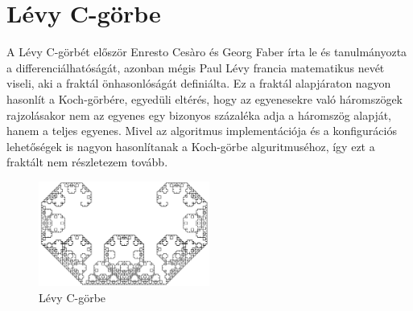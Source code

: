 \section*{Lévy C-görbe}
A Lévy C-görbét először Enresto Cesàro és Georg Faber írta le és tanulmányozta a differenciálhatóságát, azonban mégis Paul Lévy francia matematikus nevét viseli, aki a fraktál önhasonlóságát definiálta. Ez a fraktál alapjáraton nagyon hasonlít a Koch-görbére, egyedüli eltérés, hogy az egyenesekre való háromszögek rajzolásakor nem az egyenes egy bizonyos százaléka adja a háromszög alapját, hanem a teljes egyenes. Mivel az algoritmus implementációja és a konfigurációs lehetőségek is nagyon hasonlítanak a Koch-görbe alguritmuséhoz, így ezt a fraktált nem részletezem tovább.
\begin{figure}[!ht]
	\begin{center}
		\includegraphics[width=0.5\textwidth]{img/LevyCCurve}
		\caption[labelInTOC]{Lévy C-görbe}
	\end{center}
\end{figure}
